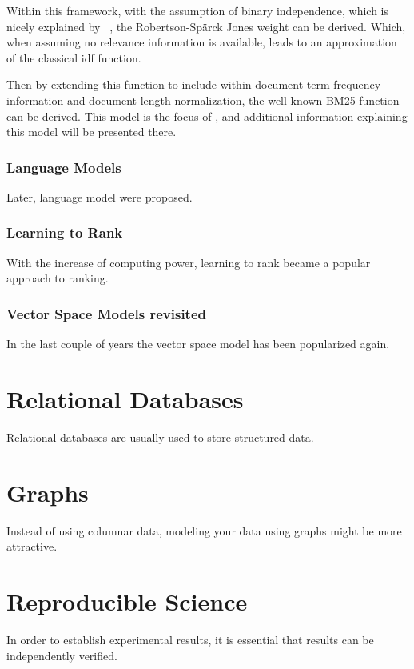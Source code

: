 Within this framework, with the assumption of binary independence, which is nicely explained by ~\citet{bm25-beyond}, the Robertson-Sp{\"a}rck Jones weight can be derived. Which, when assuming no relevance information is available, leads to an approximation of the classical idf function.

Then by extending this function to include within-document term frequency information and document length normalization, the well known BM25 function can be derived.
This model is the focus of , and additional information explaining this model will be presented there.

\subsubsection{Language Models}
Later, language model were proposed. 


\subsubsection{Learning to Rank}
With the increase of computing power, learning to rank became a popular approach to ranking.

\subsubsection{Vector Space Models revisited}
In the last couple of years the vector space model has been popularized again. 

\section{Relational Databases}
Relational databases are usually used to store structured data. 

\section{Graphs}
Instead of using columnar data, modeling your data using graphs might be more attractive. 

\section{Reproducible Science}
In order to establish experimental results, it is essential that results can be independently verified. 